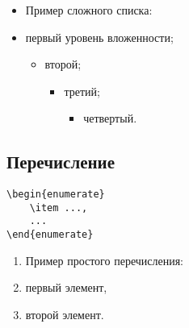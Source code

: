 \documentclass[14pt, a4paper, titlepage]{extarticle}
\begin{document}
\begin{itemize}
    \item[] Пример сложного списка:
    \item первый уровень вложенности;
    \begin{itemize}
        \item второй;
        \begin{itemize}
            \item третий;
            \begin{itemize}
                \item четвертый.
            \end{itemize}
        \end{itemize}
    \end{itemize}
\end{itemize}

\subsection{Перечисление}

\begin{verbatim}
\begin{enumerate}
    \item ...,
    ...
\end{enumerate} 
\end{verbatim}

\begin{enumerate}
    \item[] Пример простого перечисления:
    \item первый элемент,
    \item второй элемент.
\end{enumerate}
\end{document}
